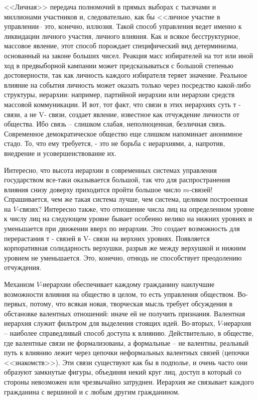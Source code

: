 \documentclass{book}
\begin{document}
<<Личная>> передача полномочий в прямых выборах с тысячами и миллионами участников и, следовательно, как бы <<личное уча­стие в управлении-- это, конечно, иллюзия. Такой способ управле­ния ведет именно к ликвидации личного участия, личного влия­ния. Как и всякое бесструктурное, массовое явление, этот спо­соб порождает специфический вид детерминизма, основанный на законе больших чисел. Реакция масс избирателей на тот или иной ход в предвыборной кампании может предсказываться с большой степенью достоверности, так как личность каждо­го избирателя теряет значение. Реальное влияние на события личность может оказать только через посредство какой-либо структуры, иерархии: например, партийной иерархии или иерар­хии средств массовой коммуникации. И вот, тот факт, что связи в этих иерархиях суть т -  связи, а не V-  связи, создает явление, известное как отчуждение  личности от общества. Ибо связь -- слишком слабая, неполноценная, безличная связь. Современное демократическое общество еще слишком напоминает аноним­ное 
стадо.  То, что ему требуется, - это не борьба с иерархиями, а, напротив, внедрение и усовершенствование их.

Интересно, что высота иерархии в современных системах уп­равления государством все-таки оказывается большой, так что для распространения влияния снизу доверху приходится пройти большое число $m$-связей! Спрашивается, чем же такая система лучше, чем система, целиком построенная на $V$-связях? Инте­ресно также, что отношение числа лиц на определенном уровне к числу лиц на следующем уровне бывает особенно велико на нижних уровнях и уменьшается при движении вверх по иерар­хии. Это создает возможность для перерастания т -  связей в V-  связи на верхних уровнях. Появляется корпоративная соли­дарность верхушки, разрыв же между верхушкой и нижним уровнем не уменьшается. Это, конечно, отнюдь не способствует преодолению отчуждения.

Механизм $V$-иерархии обеспечивает каждому гражданину наилучшие возможности влияния на общество в целом, то есть управления обществом. Во-первых, потому, что всякая новая, творческая мысль требует обсуждения в обстановке валентных отношений: иначе ей не получить признания. Валентная иерархия служит фильтром для выделения стоящих идей. Во-вторых, $V$-иерархия -- наиболее справедливый  способ до­ступа к влиянию. Действительно, в обществе, где валентные связи не формализованы, а формальные -- не валентны, реальный путь к влиянию лежит через цепочки неформальных валентных связей (цепочки <<знакомств>>). Эти связи существуют как бы в подполье, и очень часто они образуют замкнутые фигуры, объе­диняя некий круг лиц, доступ в который со стороны невозможен или чрезвычайно затруднен. Иерархия же связывает каждого гражданина с вершиной и с любым другим гражданином.
\end{document}
